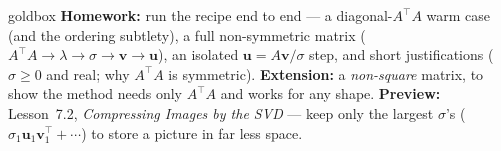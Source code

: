 \documentclass[10pt]{article}
\newcommand{\uu}{\mathbf{u}}
\newcommand{\vv}{\mathbf{v}}
\newcommand{\T}{^{\top}}
\begin{document}
\begin{skillbox}{goldbox}
\textbf{Homework:} run the recipe end to end --- a diagonal-$A\T A$ warm case (and the ordering
subtlety), a full non-symmetric matrix ($A\T A\to\lambda\to\sigma\to\vv\to\uu$), an isolated
$\uu=A\vv/\sigma$ step, and short justifications ($\sigma\ge0$ and real; why $A\T A$ is symmetric).
\textbf{Extension:} a \emph{non-square} matrix, to show the method needs only $A\T A$ and works for any
shape. \textbf{Preview:} Lesson~7.2, \emph{Compressing Images by the SVD} --- keep only the largest
$\sigma$'s ($\sigma_1\uu_1\vv_1\T+\cdots$) to store a picture in far less space.
\end{skillbox}
\end{document}
